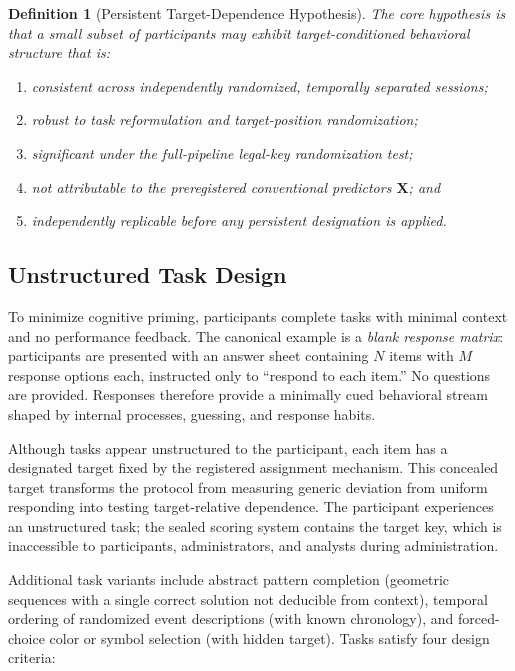 \documentclass[11pt,letterpaper]{article}
\newtheorem{definition}{Definition}
\begin{document}
\begin{definition}[Persistent Target-Dependence Hypothesis]
The core hypothesis is that a small subset of participants may exhibit target-conditioned behavioral structure that is:
\begin{enumerate}[nosep]
    \item consistent across independently randomized, temporally separated sessions;
    \item robust to task reformulation and target-position randomization;
    \item significant under the full-pipeline legal-key randomization test;
    \item not attributable to the preregistered conventional predictors $\mathbf{X}$; and
    \item independently replicable before any persistent designation is applied.
\end{enumerate}
\end{definition}

\subsection{Unstructured Task Design}

To minimize cognitive priming, participants complete tasks with minimal context and no performance feedback. The canonical example is a \textit{blank response matrix}: participants are presented with an answer sheet containing $N$ items with $M$ response options each, instructed only to ``respond to each item.'' No questions are provided. Responses therefore provide a minimally cued behavioral stream shaped by internal processes, guessing, and response habits.

Although tasks appear unstructured to the participant, each item has a designated target fixed by the registered assignment mechanism. This concealed target transforms the protocol from measuring generic deviation from uniform responding into testing target-relative dependence. The participant experiences an unstructured task; the sealed scoring system contains the target key, which is inaccessible to participants, administrators, and analysts during administration.

Additional task variants include abstract pattern completion (geometric sequences with a single correct solution not deducible from context), temporal ordering of randomized event descriptions (with known chronology), and forced-choice color or symbol selection (with hidden target). Tasks satisfy four design criteria:
\end{document}
